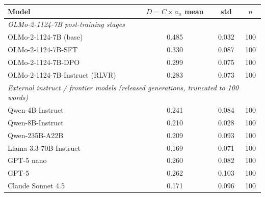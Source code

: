 \begin{tabular}{lccc}
\toprule
Model & $D = C \times a_n$ mean & std & $n$ \\
\midrule
\multicolumn{4}{l}{\textit{OLMo-2-1124-7B post-training stages}} \\
\quad OLMo-2-1124-7B (base) & 0.485 & 0.032 & 100 \\
\quad OLMo-2-1124-7B-SFT & 0.330 & 0.087 & 100 \\
\quad OLMo-2-1124-7B-DPO & 0.299 & 0.075 & 100 \\
\quad OLMo-2-1124-7B-Instruct (RLVR) & 0.283 & 0.073 & 100 \\
\midrule
\multicolumn{4}{l}{\textit{External instruct / frontier models (released generations, truncated to 100 words)}} \\
\quad Qwen-4B-Instruct & 0.241 & 0.084 & 100 \\
\quad Qwen-8B-Instruct & 0.210 & 0.028 & 100 \\
\quad Qwen-235B-A22B & 0.209 & 0.093 & 100 \\
\quad Llama-3.3-70B-Instruct & 0.169 & 0.071 & 100 \\
\quad GPT-5 nano & 0.260 & 0.082 & 100 \\
\quad GPT-5 & 0.262 & 0.103 & 100 \\
\quad Claude Sonnet 4.5 & 0.171 & 0.096 & 100 \\
\bottomrule
\end{tabular}
